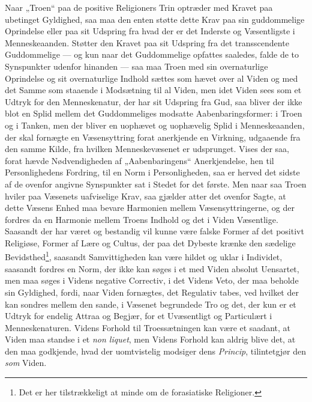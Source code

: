 Naar „Troen“ paa de positive Religioners Trin optræder med Kravet paa ubetinget
Gyldighed, saa maa den enten støtte dette Krav paa sin guddommelige Oprindelse
eller paa sit Udspring fra hvad der er det Inderste og Væsentligste i
Menneskeaanden. Støtter den Kravet paa sit Udspring fra det transscendente
Guddommelige --- og kun naar det Guddommelige opfattes saaledes, falde de to
Synspunkter udenfor hinanden --- saa maa Troen med sin overnaturlige Oprindelse
og sit overnaturlige Indhold sættes som hævet over al Viden og med det Samme som
staaende i
 \setcounter{footnote}{0}%
Modsætning til al Viden, men idet Viden sees som et Udtryk for den
Menneskenatur, der har sit Udspring fra Gud, saa bliver der ikke blot en Splid
mellem det Guddommeliges modsatte Aabenbaringsformer: i Troen og i Tanken, men
der bliver en uophævet og uophævelig Splid i Menneskeaanden, der skal fornægte
en Væsensyttring forat anerkjende en Virkning, udgaaende fra den samme Kilde,
fra hvilken Menneskevæsenet er udsprunget. Vises der saa, forat hævde
Nødvendigheden af „Aabenbaringens“ Anerkjendelse, hen til Personlighedens
Fordring, til en Norm i Personligheden, saa er herved det sidste af de ovenfor
angivne Synspunkter sat i Stedet for det første. Men naar saa Troen hviler paa
Væsenets uafviselige Krav, saa gjælder atter det ovenfor Sagte, at dette Væsens
Enhed maa bevare Harmonien mellem Væsensyttringerne, og der fordres da en
Harmonie mellem Troens Indhold og det i Viden Væsentlige. Saasandt der har været
og bestandig vil kunne være falske Former af det positivt Religiøse, Former af
Lære og Cultus, der paa det Dybeste krænke den sædelige
Bevidsthed\footnote{Det er her tilstrækkeligt at minde om de forasiatiske
Religioner.}, saasandt Samvittigheden kan være hildet og uklar i Individet,
saasandt fordres en Norm, der ikke kan søges i et med Viden absolut Uensartet,
men maa søges i Videns negative Correctiv, i det Videns Veto, der maa beholde
sin Gyldighed, fordi, naar Viden fornægtes, det Regulativ tabes, ved hvilket der
kan sondres mellem den sande, i Væsenet begrundede Tro og det, der kun er et
Udtryk for endelig Attraa og Begjær, for et Uvæsentligt og Particulært i
Menneskenaturen. Videns Forhold til Troessætningen kan være et saadant, at Viden
maa standse i et \textit{non liquet}, men Videns Forhold kan aldrig blive det,
at den maa godkjende, hvad der uomtvistelig modsiger dens \emph{Princip},
tilintetgjør den \emph{som} Viden.

